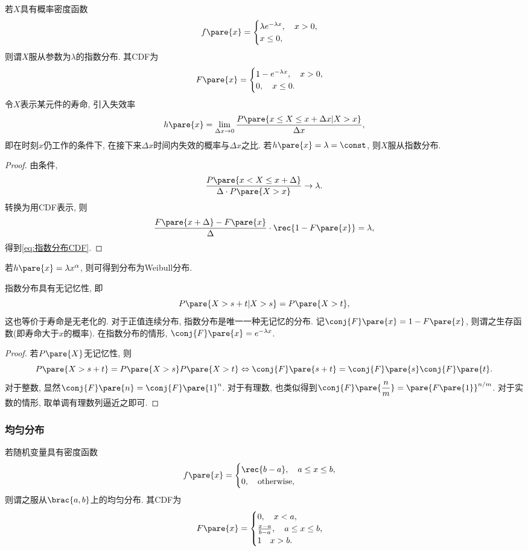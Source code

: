 \documentclass{ctexart}
\begin{document}
若$X$具有概率密度函数
\[ f\pare{x} = \begin{cases}
    \lambda e^{-\lambda x},\quad x> 0,\\
    x \le 0,
\end{cases} \]
则谓$X$服从参数为$\lambda$的指数分布. 其CDF为
\begin{equation}
    F\pare{x} = \begin{cases}
    \label{eq:指数分布CDF}
    1 - e^{-\lambda x},\quad x> 0,\\
    0,\quad x\le 0.
    \end{cases}
\end{equation}
令$X$表示某元件的寿命, 引入失效率
\[ h\pare{x} = \lim_{\Delta x \rightarrow 0} \frac{P\pare{x \le X \le x+\Delta x \vert X>x}}{\Delta x}, \]
即在时刻$x$仍工作的条件下, 在接下来$\Delta x$时间内失效的概率与$\Delta x$之比. 若$h\pare{x} = \lambda = \const$, 则$X$服从指数分布.
\begin{proof}
    由条件,
    \[ \frac{P\pare{x<X\le x+\Delta}}{\Delta \cdot P\pare{X>x}} \rightarrow \lambda. \]
    转换为用CDF表示, 则
    \[ \frac{F\pare{x+\Delta} - F\pare{x}}{\Delta}\cdot \rec{1-F\pare{x}} = \lambda, \]
    得到\eqref{eq:指数分布CDF}.
\end{proof}
\begin{remark}
    若$h\pare{x} = \lambda x^\alpha$, 则可得到分布为Weibull分布.
\end{remark}
指数分布具有无记忆性, 即
\[ P\pare{X>s+t \vert X>s} = P\pare{X>t}, \]
这也等价于寿命是无老化的. 对于正值连续分布, 指数分布是唯一一种无记忆的分布. 记$\conj{F}\pare{x} = 1 - F\pare{x}$, 则谓之生存函数(即寿命大于$x$的概率). 在指数分布的情形, $\conj{F}\pare{x} = e^{-\lambda x}$.
\begin{proof}
    若$P\pare{X}$无记忆性, 则
    \[ P\pare{X>s+t} = P\pare{X>s}P\pare{X>t} \Leftrightarrow \conj{F}\pare{s+t} = \conj{F}\pare{s}\conj{F}\pare{t}. \]
    对于整数, 显然$\conj{F}\pare{n} = \conj{F}\pare{1}^n$. 对于有理数, 也类似得到$\displaystyle \conj{F}\pare{\frac{n}{m}} = \pare{F\pare{1}}^{n/m}$. 对于实数的情形, 取单调有理数列逼近之即可.
\end{proof}


\subsubsection{均匀分布} %
\label{ssub:均匀分布}

若随机变量具有密度函数
\[ f\pare{x} = \begin{cases}
    \rec{b-a},\quad a\le x\le b,\\
    0,\quad \mathrm{otherwise},
\end{cases} \]
则谓之服从$\brac{a,b}$上的均匀分布. 其CDF为
\[ F\pare{x} = \begin{cases}
    0,\quad x<a,\\
    \frac{x-a}{b-a},\quad a\le x\le b,\\
    1\quad x>b.
\end{cases} \]
\end{document}
